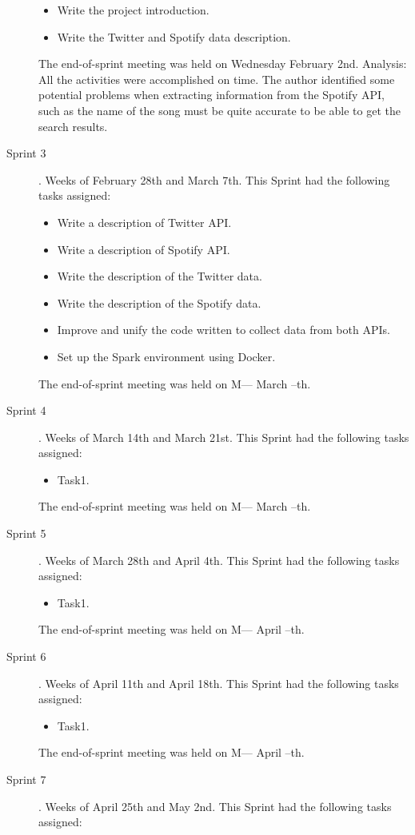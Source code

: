 \begin{description}
\begin{itemize}
		\item Write the project introduction.
		\item Write the Twitter and Spotify data description.
	\end{itemize}
	The end-of-sprint meeting was held on Wednesday February 2nd.
	Analysis: All the activities were accomplished on time. The author identified some potential problems when extracting information from the Spotify API, such as the name of the song must be quite accurate to be able to get the search results.
	\item[Sprint 3]. Weeks of February 28th and March 7th. This Sprint had the following tasks assigned:
	\begin{itemize}		
		\item Write a description of Twitter API.
		\item Write a description of Spotify API.
		\item Write the description of the Twitter data.
		\item Write the description of the Spotify data.
		\item Improve and unify the code written to collect data from both APIs.
		\item Set up the Spark environment using Docker.
	\end{itemize}
	The end-of-sprint meeting was held on M--- March --th.
	\item[Sprint 4]. Weeks of March 14th and March 21st. This Sprint had the following tasks assigned:
	\begin{itemize}
		\item Task1.
	\end{itemize}
	The end-of-sprint meeting was held on M--- March --th.
	\item[Sprint 5]. Weeks of March 28th and April 4th. This Sprint had the following tasks assigned:
	\begin{itemize}
		\item Task1.
	\end{itemize}
	The end-of-sprint meeting was held on M--- April --th.
	\item[Sprint 6]. Weeks of April 11th and April 18th. This Sprint had the following tasks assigned:
	\begin{itemize}
		\item Task1.
	\end{itemize}
	The end-of-sprint meeting was held on M--- April --th.
	\item[Sprint 7]. Weeks of April 25th and May 2nd. This Sprint had the following tasks assigned:

\end{description}
